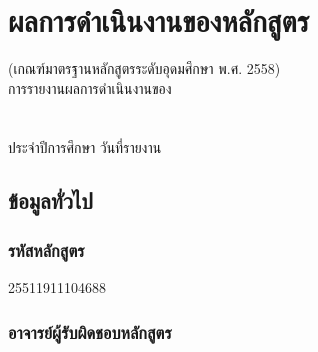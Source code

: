 \chapter{ผลการดำเนินงานของหลักสูตร}

\begin{center}
(เกณฑ์มาตรฐานหลักสูตรระดับอุดมศึกษา พ.ศ. 2558)\\[1cm]
การรายงานผลการดำเนินงานของ\\ \printprogram{} \\
\printfaculty{}  \printuniversity{}\\
ประจำปีการศึกษา \printyear{} วันที่รายงาน \printrepdate{}
\end{center}

\section{ข้อมูลทั่วไป}

\subsection*{รหัสหลักสูตร}
25511911104688

\subsection*{อาจารย์ผู้รับผิดชอบหลักสูตร}


